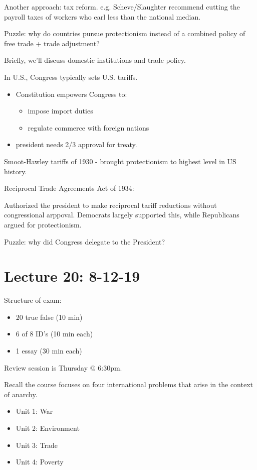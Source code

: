 \documentclass{article}
\begin{document}
Another approach: tax reform.  e.g. Scheve/Slaughter recommend cutting the payroll taxes of workers who earl less than the national median.

Puzzle: why do countries pursue protectionism instead of a combined policy of free trade + trade adjustment?

Briefly, we'll discuss domestic institutions and trade policy.

In U.S., Congress typically sets U.S. tariffs.

\begin{itemize}
  \item Constitution empowers Congress to:
    \begin{itemize}
      \item impose import duties
      \item regulate commerce with foreign nations
    \end{itemize}
  \item president needs 2/3 approval for treaty.
\end{itemize}

Smoot-Hawley tariffs of 1930 - brought protectionism to highest level in US history.

Reciprocal Trade Agreements Act of 1934:

Authorized the president to make reciprocal tariff reductions without congressional arppoval.  Democrats largely supported this, while Republicans argued for protectionism.

Puzzle: why did Congress delegate to the President?

\section{Lecture 20: 8-12-19}

Structure of exam:
\begin{itemize}
  \item 20 true false (10 min)
  \item 6 of 8 ID's (10 min each)
  \item 1 essay (30 min each)
\end{itemize}

Review session is Thursday @ 6:30pm.

Recall the course focuses on four international problems that arise in the context of anarchy.
\begin{itemize}
  \item Unit 1: War
  \item Unit 2: Environment
  \item Unit 3: Trade
  \item Unit 4: Poverty
\end{itemize}
\end{document}
